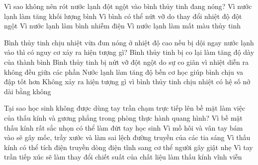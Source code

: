 \begin{ex}
Vì sao không nên rót nước lạnh đột ngột vào bình thủy tinh đang nóng?
\choice
{Vì nước lạnh làm tăng khối lượng bình}
{\True Vì bình có thể nứt vỡ do thay đổi nhiệt độ đột ngột}
{Vì nước lạnh làm bình nhiễm điện}
{Vì nước lạnh làm mất màu thủy tinh}
\end{ex}

\begin{ex}
Bình thủy tinh chịu nhiệt vừa đun nóng ở nhiệt độ cao nếu bị dội ngay nước lạnh vào thì có nguy cơ xảy ra hiện tượng gì?
\choice
{Bình thủy tinh bị co lại làm tăng độ dày của thành bình}
{\True Bình thủy tinh bị nứt vỡ đột ngột do sự co giãn vì nhiệt diễn ra không đều giữa các phần}
{Nước lạnh làm tăng độ bền cơ học giúp bình chịu va đập tốt hơn}
{Không xảy ra hiện tượng gì vì bình thủy tinh chịu nhiệt có hệ số nở dài bằng không}
\end{ex}

\begin{ex}
Tại sao học sinh không được dùng tay trần chạm trực tiếp lên bề mặt làm việc của thấu kính và gương phẳng trong phòng thực hành quang hình?
\choice
{Vì bề mặt thấu kính rất sắc nhọn có thể làm đứt tay học sinh}
{\True Vì mồ hôi và vân tay bám vào sẽ gây mốc, trầy xước và làm sai lệch đường truyền của các tia sáng}
{Vì thấu kính có thể tích điện truyền dòng điện tĩnh sang cơ thể người gây giật nhẹ}
{Vì tay trần tiếp xúc sẽ làm thay đổi chiết suất của chất liệu làm thấu kính vĩnh viễn}
\end{ex}

